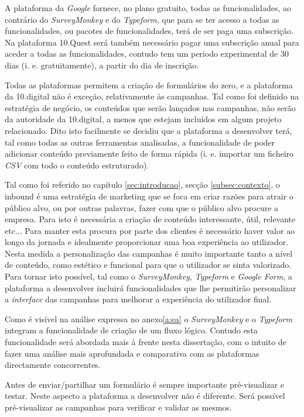 A plataforma da \textit{Google} fornece, no plano gratuito, todas as funcionalidades, ao contrário do \textit{SurveyMonkey} e do \textit{Typeform}, que para se ter acesso a todas as funcionalidades, ou pacotes de funcionalidades, terá de ser paga uma subscrição. Na plataforma 10.Quest será também necessário pagar uma subscrição anual para aceder a todas as funcionalidades, contudo tem um periodo experimental de 30 dias (i. e. gratuitamente), a partir do dia de inscrição.

Todas as plataformas permitem a criação de formulários do zero, e a plataforma da 10.digital não é exceção, relativamente às campanhas. Tal como foi definido na estratégia de negócio, os conteúdos que serão lançados nas campanhas, não serão da autoridade da 10.digital, a menos que estejam incluídos em algum projeto relacionado. Dito isto facilmente se decidiu que a plataforma a desenvolver terá, tal como todas as outras ferramentas analisadas, a funcionalidade de poder adicionar conteúdo previamente feito de forma rápida (i. e. importar um ficheiro \textit{CSV} com todo o conteúdo estruturado). 


Tal como foi referido no capítulo \ref{sec:introducao}, secção \ref{subsec:contexto}, o inbound é uma estratégia de marketing que se foca em criar razões para atrair o público alvo, ou por outras palavras, fazer com que o público alvo procure a empresa. Para isto é necessária a criação de conteúdo interessante, útil, relevante etc... Para manter esta procura por parte dos clientes é necessário haver valor ao longo da jornada e idealmente proporcionar uma boa experiência ao utilizador. Nesta medida a personalização das campanhas é muito importante tanto a nível de conteúdo, como estético e funcional para que o utilizador se sinta valorizado. Para tornar isto possível, tal como o \textit{SurveyMonkey}, \textit{Typeform} e \textit{Google Form}, a plataforma a desenvolver incluirá funcionalidades que lhe permitirão personalizar a \textit{interface} das campanhas para melhorar a experiência do utilizador final. 

Como é visível na análise expressa no anexo\ref{a:ea} o \textit{SurveyMonkey} e o \textit{Typeform} integram a funcionalidade de criação de um fluxo lógico. Contudo esta funcionalidade será abordada mais à frente nesta dissertação, com o intuito de fazer uma análise  mais aprofundada e comparativa com as plataformas directamente concorrentes.

Antes de enviar/partilhar um formulário é sempre importante pré-visualizar e testar. Neste aspecto a plataforma a desenvolver não é diferente. Será possível pré-visualizar as campanhas para verificar e validar as mesmos. 

